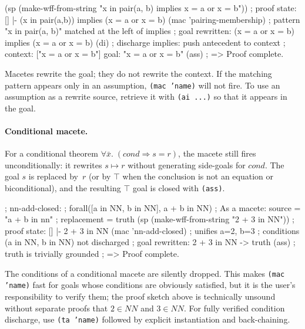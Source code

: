 \begin{VNBcode}
(sp (make-wff-from-string "x in pair(a, b) implies x = a or x = b"))
; proof state:  []  |-  (x in pair(a,b)) implies (x = a or x = b)
(mac 'pairing-membership)
; pattern "x in pair(a, b)" matched at the left of implies
; goal rewritten:  (x = a or x = b) implies (x = a or x = b)
(di)        ; discharge implies: push antecedent to context
; context: ["x = a or x = b"]   goal: "x = a or x = b"
(ass)
; => Proof complete.
\end{VNBcode}

\begin{remark}
Macetes rewrite the goal; they do not rewrite the context.  If the
matching pattern appears only in an assumption, \texttt{(mac 'name)}
will not fire.  To use an assumption as a rewrite source, retrieve it
with \texttt{(ai ...)} so that it appears in the goal.
\end{remark}

\paragraph{Conditional macete.}
For a conditional theorem
$\forall\bar{x}.\;(\mathit{cond} \Rightarrow s = r)$, the macete still
fires unconditionally: it rewrites $s \mapsto r$ without generating
side-goals for $\mathit{cond}$.  The goal $s$ is replaced by~$r$
(or by $\top$ when the conclusion is not an equation or biconditional),
and the resulting $\top$ goal is closed with \texttt{(ass)}.

\begin{VNBcode}
; nn-add-closed:
;   forall([a in NN, b in NN], a + b in NN)
; As a macete: source = "a + b in nn"
;              replacement = truth
(sp (make-wff-from-string "2 + 3 in NN"))
; proof state:  []  |-  2 + 3 in NN
(mac 'nn-add-closed)
; unifies a=2, b=3
; conditions (a in NN, b in NN) not discharged
; goal rewritten:  2 + 3 in NN  ->  truth
(ass)       ; truth is trivially grounded
; => Proof complete.
\end{VNBcode}

\begin{remark}
The conditions of a conditional macete are silently dropped.  This
makes \texttt{(mac 'name)} fast for goals whose conditions are obviously
satisfied, but it is the user's responsibility to verify them; the
proof sketch above is technically unsound without separate proofs that
$2 \in \mathit{NN}$ and $3 \in \mathit{NN}$.  For fully verified
condition discharge, use \texttt{(ta 'name)} followed by explicit
instantiation and back-chaining.
\end{remark}

